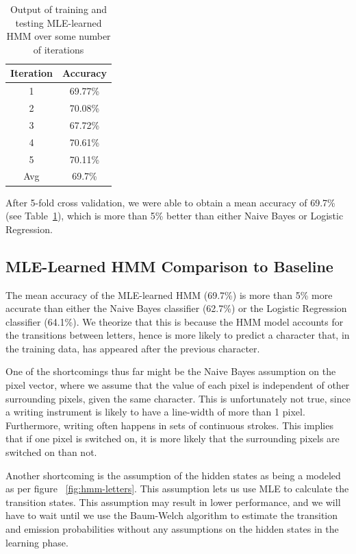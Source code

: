 \documentclass{article} %
\begin{document}
\begin{table}[h]
\centering
\begin{tabular}{|c|c|}
\hline
Iteration & Accuracy \\
\hline
1 & 69.77\% \\
2 & 70.08\% \\
3 & 67.72\% \\
4 & 70.61\% \\
5 & 70.11\% \\
\hline
Avg & 69.7\% \\ 
\hline
\end{tabular}
\caption{Output of training and testing MLE-learned HMM over some number of iterations}
\label{tab:mle-hmm-results}
\end{table}

After 5-fold cross validation, we were able to obtain a mean accuracy of 69.7\% (see Table~\ref{tab:mle-hmm-results}), which is more than 5\% better than either Naive Bayes or Logistic Regression.

\subsection{MLE-Learned HMM Comparison to Baseline}

The mean accuracy of the MLE-learned HMM (69.7\%) is more than 5\% more accurate than either the Naive Bayes classifier (62.7\%) or the Logistic Regression classifier (64.1\%). We theorize that this is because the HMM model accounts for the transitions between letters, hence is more likely to predict a character that, in the training data, has appeared after the previous character.

One of the shortcomings thus far might be the Naive Bayes assumption on the pixel vector, where we assume that the value of each pixel is independent of other surrounding pixels, given the same character. This is unfortunately not true, since a writing instrument is likely to have a line-width of more than 1 pixel. Furthermore, writing often happens in sets of continuous strokes. This implies that if one pixel is switched on, it is more likely that the surrounding pixels are switched on than not.

Another shortcoming is the assumption of the hidden states as being a modeled as per figure ~\ref{fig:hmm-letters}. This assumption lets us use MLE to calculate the transition states. This assumption may result in lower performance, and we will have to wait until we use the Baum-Welch algorithm to estimate the transition and emission probabilities without any assumptions on the hidden states in the learning phase.
\end{document}
